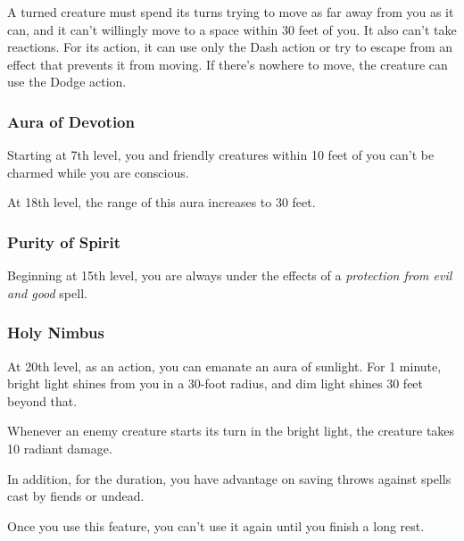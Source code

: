 A turned creature must spend its turns trying to move as far away from you as it can, and it can't willingly move to a space within 30 feet of you. It also can't take reactions. For its action, it can use only the Dash action or try to escape from an effect that prevents it from moving. If there's nowhere to move, the creature can use the Dodge action.

\subsubsection{Aura of Devotion}

Starting at 7th level, you and friendly creatures within 10 feet of you can't be charmed while you are conscious.

At 18th level, the range of this aura increases to 30 feet.

\subsubsection{Purity of Spirit}

Beginning at 15th level, you are always under the effects of a \textit{protection from evil and good} spell.

\subsubsection{Holy Nimbus}

At 20th level, as an action, you can emanate an aura of sunlight. For 1 minute, bright light shines from you in a 30-foot radius, and dim light shines 30 feet beyond that.

Whenever an enemy creature starts its turn in the bright light, the creature takes 10 radiant damage.

In addition, for the duration, you have advantage on saving throws against spells cast by fiends or undead.

Once you use this feature, you can't use it again until you finish a long rest.

